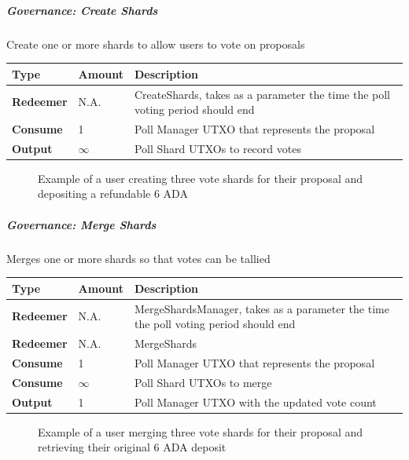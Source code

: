 \documentclass{article}
\begin{document}
\begin{sloppypar}
\hypertarget{governance-create-shards}{%
\subparagraph{Governance: Create
Shards}\label{governance-create-shards}}

Create one or more shards to allow users to vote on proposals

\begin{tabularx}{\linewidth}{l|l|L}
\toprule
\textbf{Type} & \textbf{Amount} & \textbf{Description}
\tabularnewline
\midrule
\endhead
\textbf{Redeemer} & N.A. & CreateShards, takes as a parameter the time
the poll voting period should end
\tabularnewline
\midrule
\textbf{Consume} & 1 & Poll Manager UTXO that represents the
proposal
\tabularnewline
\midrule
\textbf{Output} & \(\infty\) & Poll Shard UTXOs to record
votes
\tabularnewline
\bottomrule
\end{tabularx}

\hypertarget{governance-create-shards-figure}{%
\begin{figure}[htbp]
\centering

\caption{Example of a user creating three vote shards for their
proposal and depositing a refundable 6 ADA}
\label{governance-create-shards-figure}
\end{figure}}

\hypertarget{governance-merge-shards}{%
\subparagraph{Governance: Merge Shards}\label{governance-merge-shards}}

Merges one or more shards so that votes can be tallied

\begin{tabularx}{\linewidth}{l|l|L}
\toprule
\textbf{Type} & \textbf{Amount} & \textbf{Description}
\tabularnewline
\midrule
\endhead
\textbf{Redeemer} & N.A. & MergeShardsManager, takes as a parameter the
time the poll voting period should end
\tabularnewline
\midrule
\textbf{Redeemer} & N.A. & MergeShards
\tabularnewline
\midrule
\textbf{Consume} & 1 & Poll Manager UTXO that represents the
proposal
\tabularnewline
\midrule
\textbf{Consume} & \(\infty\) & Poll Shard UTXOs to merge
\tabularnewline
\midrule
\textbf{Output} & 1 & Poll Manager UTXO with the updated vote
count
\tabularnewline
\bottomrule
\end{tabularx}

\hypertarget{governance-merge-shards-figure}{%
\begin{figure}[htbp]
\centering

\caption{Example of a user merging three vote shards for their
proposal and retrieving their original 6 ADA deposit}
\label{governance-merge-shards-figure}
\end{figure}}


\end{sloppypar}
\end{document}
